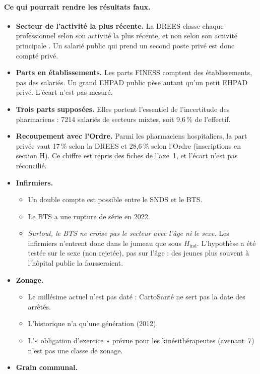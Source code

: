 \documentclass[11pt]{article}
\begin{document}
\paragraph{Ce qui pourrait rendre les résultats faux.}
\begin{itemize}
  \item \textbf{Secteur de l'activité la plus récente.} La DREES classe chaque professionnel selon son activité la
  plus récente, et non selon son activité principale \citep{drees2026demo}. Un salarié public qui prend un second
  poste privé est donc compté privé.
  \item \textbf{Parts en établissements.} Les parts FINESS comptent des établissements, pas des salariés. Un grand
  EHPAD public pèse autant qu'un petit EHPAD privé. L'écart n'est pas mesuré.
  \item \textbf{Trois parts supposées.} Elles portent l'essentiel de l'incertitude des pharmaciens : \num{7214}
  salariés de secteurs mixtes, soit 9,6\,\% de l'effectif\derive{}.
  \item \textbf{Recoupement avec l'Ordre.} Parmi les pharmaciens hospitaliers, la part privée vaut 17\,\% selon la
  DREES et 28,6\,\% selon l'Ordre (inscriptions en section H). Ce chiffre est repris des fiches de l'axe~1, et
  l'écart n'est pas réconcilié.
  \item \textbf{Infirmiers.}
  \begin{itemize}
    \item Un double compte est possible entre le SNDS et le BTS.
    \item Le BTS a une rupture de série en 2022.
    \item \emph{Surtout, le BTS ne croise pas le secteur avec l'âge ni le sexe.} Les infirmiers n'entrent
    donc dans le jumeau que sous $H_{\mathrm{ind}}$. L'hypothèse a été testée sur le sexe (non rejetée), pas sur
    l'âge : des jeunes plus souvent à l'hôpital public la fausseraient.
  \end{itemize}
  \item \textbf{Zonage.}
  \begin{itemize}
    \item Le millésime actuel n'est pas daté : CartoSanté ne sert pas la date des arrêtés.
    \item L'historique n'a qu'une génération (2012).
    \item L'« obligation d'exercice » prévue pour les kinésithérapeutes (avenant~7) n'est pas une classe de zonage.
  \end{itemize}
  \item \textbf{Grain communal.}

\end{itemize}
\end{document}
